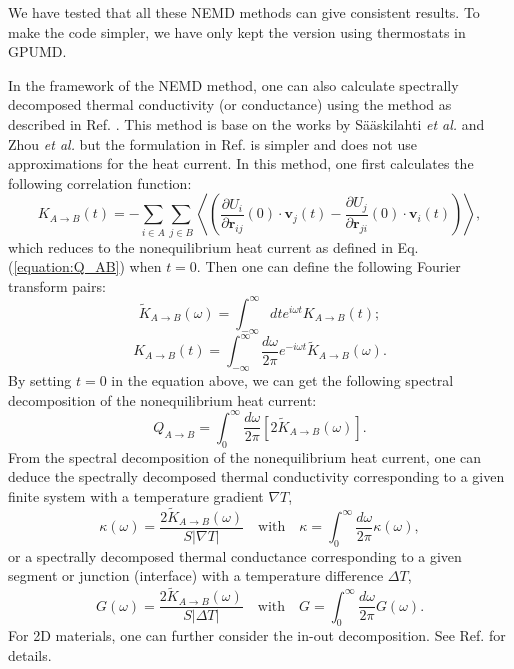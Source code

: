 \documentclass[12pt,a4paper]{report}
\newcommand{\vect}[1]{\boldsymbol{#1}}
\begin{document}
We have tested that all these NEMD methods can give consistent results. To make the code simpler, we have only kept the version using thermostats in GPUMD.

In the framework of the NEMD method, one can also calculate spectrally decomposed thermal conductivity (or conductance) using the method as described in Ref. \cite{fan2017prb}. This method is base on the works by S\"a\"askilahti \textit{et al.} \cite{saaskilahti2014prb,saaskilahti2015prb} and Zhou \textit{et al.} \cite{zhou2015prb_b} but the formulation in Ref. \cite{fan2017prb} is simpler and does not use approximations for the heat current. In this method, one first calculates the following correlation function:
\begin{equation}
\label{equation:K_time}
\boxed{
K_{A \rightarrow B}(t) = - \sum_{i \in A} \sum_{j \in B}
\left\langle
\left(\frac{\partial U_i}{\partial \vect{r}_{ij}} (0)\cdot \vect{v}_j(t)
-\frac{\partial U_j}{\partial \vect{r}_{ji}} (0) \cdot \vect{v}_i (t) \right)
\right\rangle
},
\end{equation}
which reduces to the nonequilibrium heat current as defined in Eq. (\ref{equation:Q_AB}) when $t=0$. Then one can define the following Fourier transform pairs:
\begin{equation}
\label{equation:K_omega_from_time}
\boxed{
\tilde{K}_{A \rightarrow B}(\omega)
= \int_{-\infty}^{\infty} dt e^{i\omega t}
K_{A \rightarrow B}(t)
};
\end{equation}
\begin{equation}
\label{equation:K_time_from_omega}
\boxed{
K_{A \rightarrow B}(t)
= \int_{-\infty}^{\infty} \frac{d\omega}{2\pi} e^{-i\omega t}
\tilde{K}_{A \rightarrow B}(\omega)
}.
\end{equation}
By setting $t=0$ in the equation above, we can get the following spectral decomposition of the nonequilibrium heat current:
\begin{equation}
\boxed{
Q_{A \rightarrow B}
= \int_{0}^{\infty} \frac{d\omega}{2\pi}
\left[2\tilde{K}_{A \rightarrow B}(\omega)\right]
}.
\end{equation}
From the spectral decomposition of the nonequilibrium heat current, one can deduce the spectrally decomposed thermal conductivity corresponding to a given finite system with a temperature gradient $\nabla T$,
\begin{equation}
\boxed{
\kappa(\omega)
= \frac{2\tilde{K}_{A \rightarrow B}(\omega)}{S|\nabla T|}
\quad
\text{with}
\quad
\kappa = \int_{0}^{\infty} \frac{d\omega}{2\pi} \kappa(\omega)
},
\end{equation}
or a spectrally decomposed thermal conductance corresponding to a given segment or junction (interface) with a temperature difference $\Delta T$,
\begin{equation}
\boxed{
G(\omega)
= \frac{2\tilde{K}_{A \rightarrow B}(\omega)}{S|\Delta T|}
\quad
\text{with}
\quad
G = \int_{0}^{\infty} \frac{d\omega}{2\pi} G(\omega)
}.
\end{equation}
For 2D materials, one can further consider the in-out decomposition. See Ref. \cite{fan2017prb} for details.
\end{document}

